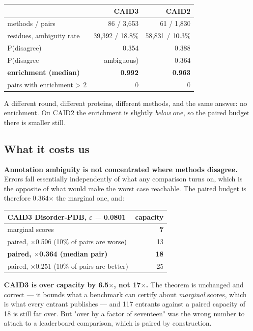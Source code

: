 \begin{center}\footnotesize
\begin{tabular}{lrr}
\toprule
\textbf{} & \textbf{CAID3} & \textbf{CAID2} \\
\midrule
methods / pairs & 86 / 3,653 & 61 / 1,830 \\
residues, ambiguity rate & 39,392 / 18.8\% & 58,831 / 10.3\% \\
P(disagree) & 0.354 & 0.388 \\
P(disagree \ & ambiguous) & 0.364 \\
\textbf{enrichment (median)} & \textbf{0.992} & \textbf{0.963} \\
pairs with enrichment > 2 & 0 & 0 \\
\bottomrule
\end{tabular}
\end{center}

A different round, different proteins, different methods, and the same answer:
no enrichment. On CAID2 the enrichment is slightly \emph{below} one, so the paired
budget there is smaller still.


\subsection*{What it costs us}

\textbf{Annotation ambiguity is not concentrated where methods disagree.} Errors fall
essentially independently of what any comparison turns on, which is the opposite
of what would make the worst case reachable. The paired budget is therefore
0.364$\times$ the marginal one, and:

\begin{center}\footnotesize
\begin{tabular}{lr}
\toprule
\textbf{CAID3 Disorder-PDB, $\varepsilon$ = 0.0801} & \textbf{capacity} \\
\midrule
marginal scores & \textbf{7} \\
paired, $\times$0.506 (10\% of pairs are worse) & 13 \\
\textbf{paired, $\times$0.364 (median pair)} & \textbf{18} \\
paired, $\times$0.251 (10\% of pairs are better) & 25 \\
\bottomrule
\end{tabular}
\end{center}

\textbf{CAID3 is over capacity by 6.5$\times$, not 17$\times$.} The theorem is unchanged and
correct --- it bounds what a benchmark can certify about \emph{marginal} scores, which
is what every entrant publishes --- and 117 entrants against a paired capacity of
18 is still far over. But "over by a factor of seventeen" was the wrong number
to attach to a leaderboard comparison, which is paired by construction.


